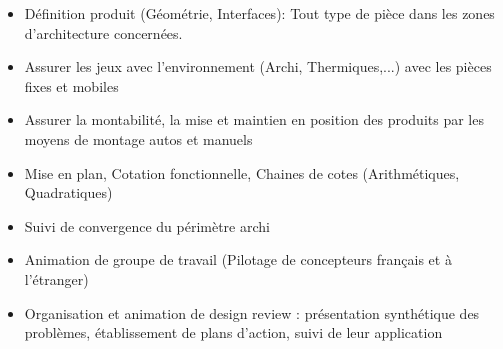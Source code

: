 \documentclass[]{friggeri-cv}
\begin{document}
\vspace{0.5mm}
\begin{itemize}
\setlength{\itemsep}{1pt}
\setlength{\parskip}{0pt}
\setlength{\parsep}{0pt}

\item Définition produit (Géométrie, Interfaces): Tout type de pièce dans les zones d'architecture concernées.
\item Assurer les jeux avec l'environnement (Archi, Thermiques,...) avec les pièces fixes et mobiles
\item Assurer la montabilité, la mise et maintien en position des produits par les moyens de montage autos et manuels
\item Mise en plan, Cotation fonctionnelle, Chaines de cotes (Arithmétiques, Quadratiques)
\item Suivi de convergence du périmètre archi
\item Animation de groupe de travail (Pilotage de concepteurs français et à l'étranger)
\item Organisation et animation de design review : présentation synthétique des problèmes, établissement de plans d’action, suivi de leur application
\end{itemize}

\vspace*{-0.5cm}
\vspace*{0.45cm}
\end{document}
